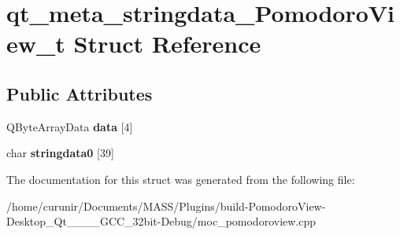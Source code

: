 \hypertarget{structqt__meta__stringdata___pomodoro_view__t}{}\section{qt\+\_\+meta\+\_\+stringdata\+\_\+\+Pomodoro\+View\+\_\+t Struct Reference}
\label{structqt__meta__stringdata___pomodoro_view__t}
\subsection*{Public Attributes}
\begin{DoxyCompactItemize}
\item 
Q\+Byte\+Array\+Data {\bfseries data} \mbox{[}4\mbox{]}\hypertarget{structqt__meta__stringdata___pomodoro_view__t_a2a708fc9c807e0dcee6e6c7164c522a3}{}\label{structqt__meta__stringdata___pomodoro_view__t_a2a708fc9c807e0dcee6e6c7164c522a3}

\item 
char {\bfseries stringdata0} \mbox{[}39\mbox{]}\hypertarget{structqt__meta__stringdata___pomodoro_view__t_ad82032c0aa8c4d8ca8d7265a30c592d2}{}\label{structqt__meta__stringdata___pomodoro_view__t_ad82032c0aa8c4d8ca8d7265a30c592d2}

\end{DoxyCompactItemize}


The documentation for this struct was generated from the following file\+:\begin{DoxyCompactItemize}
\item 
/home/curunir/\+Documents/\+M\+A\+S\+S/\+Plugins/build-\/\+Pomodoro\+View-\/\+Desktop\+\_\+\+Qt\+\_\+\_\+\_\+\_\+\+G\+C\+C\+\_\+32bit-\/\+Debug/moc\+\_\+pomodoroview.\+cpp\end{DoxyCompactItemize}
